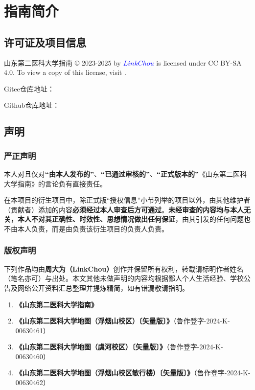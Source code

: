 \chapter[指南简介]{指南简介}

\section[许可证及项目信息]{许可证及项目信息}
山东第二医科大学指南 © 2023-2025 by \textcolor{blue}{$LinkChou$} is licensed under CC BY-SA 4.0. To view a copy of this license, visit .

Gitee仓库地址：

Github仓库地址：

\section[声明]{声明}
\label{copyright}
\subsection[严正声明]{严正声明}
本人对且仅对\textbf{“由本人发布的”}、\textbf{“已通过审核的”}、\textbf{“正式版本的”}《山东第二医科大学指南》的言论负有直接责任。

在本项目的衍生项目中，除正式版“授权信息”小节列举的项目以外，由其他维护者（贡献者）添加的内容\textbf{必须经过本人审查后方可通过}。\textbf{未经审查的内容均与本人无关，本人不对其正确性、时效性、思想情况做出任何保证}，由其引发的任何问题也不由本人负责，而是由负责该衍生项目的负责人负责。

\subsection[版权声明]{版权声明}
下列作品均由\textbf{周大为（LinkChou）}创作并保留所有权利，转载请标明作者姓名（笔名亦可）与出处。本文其他未做声明的内容均根据鄙人个人生活经验、学校公告及网络公开资料汇总整理并提炼精简，如有错漏敬请指明。

\begin{enumerate}
    \item \textbf{《山东第二医科大学指南》}
    \item \textbf{《山东第二医科大学地图（浮烟山校区）〔矢量版〕》}（鲁作登字-2024-K-00630461）
    \item \textbf{《山东第二医科大学地图（虞河校区）〔矢量版〕》}（鲁作登字-2024-K-00630460）
    \item \textbf{《山东第二医科大学地图（浮烟山校区敏行楼）〔矢量版〕》}（鲁作登字-2024-K-00630462）
\end{enumerate}

